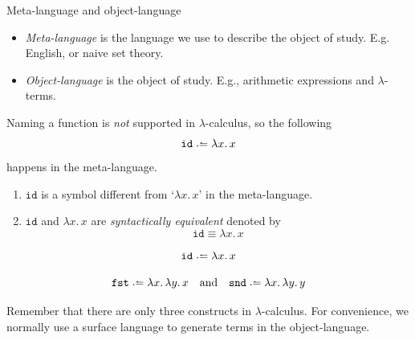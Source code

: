 \begin{frame}{Meta-language and object-language}
  \begin{itemize}
    \item \emph{Meta-language} is the language we use to describe the object of
      study. E.g. English, or naive set theory. 
    \item \emph{Object-language} is the object of study. E.g., arithmetic
      expressions and $\lambda$-terms.
  \end{itemize}
  Naming a function is \emph{not} supported in $\lambda$-calculus, so
  the following
    \[
      \mathtt{id} \defeq \lambda x.\, x
    \]
  happens in the meta-language. 
  \begin{enumerate}
    \item $\mathtt{id}$ is a symbol different from `$\lambda x.\,x$' in the meta-language.
    \item $\mathtt{id}$ and $\lambda x.\, x$ are \emph{syntactically equivalent} denoted by
      \[
        \mathtt{id} \equiv \lambda x.\, x
      \]
  \end{enumerate}
\end{frame}

\begin{frame}
  \begin{example}
    \[
      \mathtt{id} \defeq \lambda x.\, x
    \]
  \end{example}

  \begin{example}[Projections]
    \[
      \mathtt{fst} \defeq \lambda x.\, \lambda y.\, x
      \quad\text{and}\quad \mathtt{snd} \defeq \lambda x.\, \lambda y.\, y
    \]
  \end{example}
  Remember that there are only three constructs in $\lambda$-calculus.
  For convenience, we normally use a surface language to generate terms in the object-language.
\end{frame}

